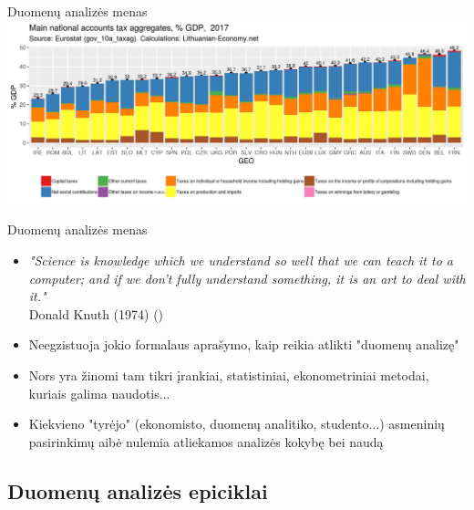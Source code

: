 \documentclass[11pt,xcolor=table]{beamer}
\begin{document}

\begin{frame}{Duomenų analizės menas}
\center
\includegraphics[scale=0.45]{Tax_GDP_2017_EU.jpeg}
\end{frame}


\begin{frame}{Duomenų analizės menas}
\begin{itemize}
\item \textit{"Science is knowledge which we understand so well that we can teach it to a computer; and if we don't fully understand something, it is an art to deal with it."}
\\Donald Knuth (1974) (\href{http://www.paulgraham.com/knuth.html}{\color{blue}{Knuth: Computer Programming as an Art}})
\item Neegzistuoja jokio formalaus aprašymo, kaip reikia atlikti "duomenų analizę"
\item Nors yra žinomi tam tikri įrankiai, statistiniai, ekonometriniai metodai, kuriais galima naudotis...
\item Kiekvieno "tyrėjo" (ekonomisto, duomenų analitiko, studento...) asmeninių pasirinkimų aibė nulemia atliekamos analizės kokybę bei naudą
\end{itemize}
\end{frame}



\subsection{Duomenų analizės epiciklai}
\end{document}
